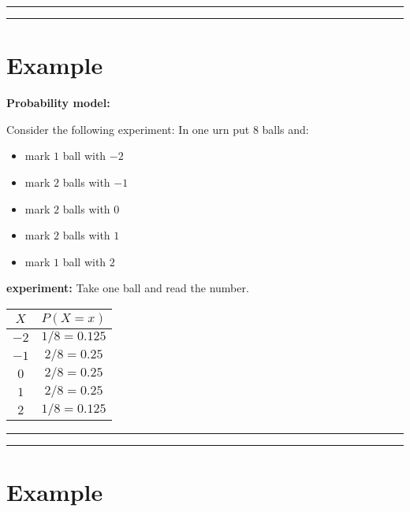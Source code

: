 \documentclass[
]{book}
\providecommand{\tightlist}{%
  \setlength{\itemsep}{0pt}\setlength{\parskip}{0pt}}
\begin{document}
\begin{center}\rule{0.5\linewidth}{0.5pt}\end{center}

\begin{center}\rule{0.5\linewidth}{0.5pt}\end{center}

\hypertarget{example-6}{%
\section{Example}\label{example-6}}

\textbf{Probability model:}

Consider the following experiment: In one urn put \(8\) balls and:

\begin{itemize}
\tightlist
\item
  mark \(1\) ball with \(-2\)
\item
  mark \(2\) balls with \(-1\)
\item
  mark \(2\) balls with \(0\)
\item
  mark \(2\) balls with \(1\)
\item
  mark \(1\) ball with \(2\)
\end{itemize}

\textbf{experiment:} Take one ball and read the number.

\begin{longtable}[]{@{}cc@{}}
\toprule
\(X\) & \(P(X=x)\) \\
\midrule
\endhead
\(-2\) & \(1/8=0.125\) \\
\(-1\) & \(2/8=0.25\) \\
\(0\) & \(2/8=0.25\) \\
\(1\) & \(2/8=0.25\) \\
\(2\) & \(1/8=0.125\) \\
\bottomrule
\end{longtable}

\begin{center}\rule{0.5\linewidth}{0.5pt}\end{center}

\begin{center}\rule{0.5\linewidth}{0.5pt}\end{center}

\hypertarget{example-7}{%
\section{Example}\label{example-7}}
\end{document}
